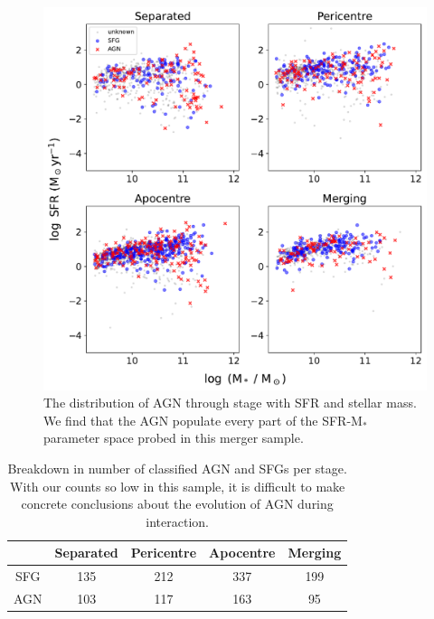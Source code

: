 \begin{figure}
    \centering
    \includegraphics[width=\textwidth]{Chapter3/figures/agn-stage-dist.pdf}
    \caption[The distribution of AGN through stage with SFR and stellar mass.]{The distribution of AGN through stage with SFR and stellar mass. We find that the AGN populate every part of the SFR-M$_{*}$ parameter space probed in this merger sample.}
    \label{fig:agn-stage}
\end{figure}

\begin{table}
    \centering
    \begin{tabular}{|c|c|c|c|c|}
		\hline
         & Separated & Pericentre & Apocentre & Merging \\
         \hline
        SFG & 135 & 212 & 337 & 199 \\
        AGN & 103 & 117 & 163 & 95 \\
		\hline
    \end{tabular}
    \caption{Breakdown in number of classified AGN and SFGs per stage. With our counts so low in this sample, it is difficult to make concrete conclusions about the evolution of AGN during interaction.}
    \label{tab:agn-sfg-breakdown}
\end{table}

